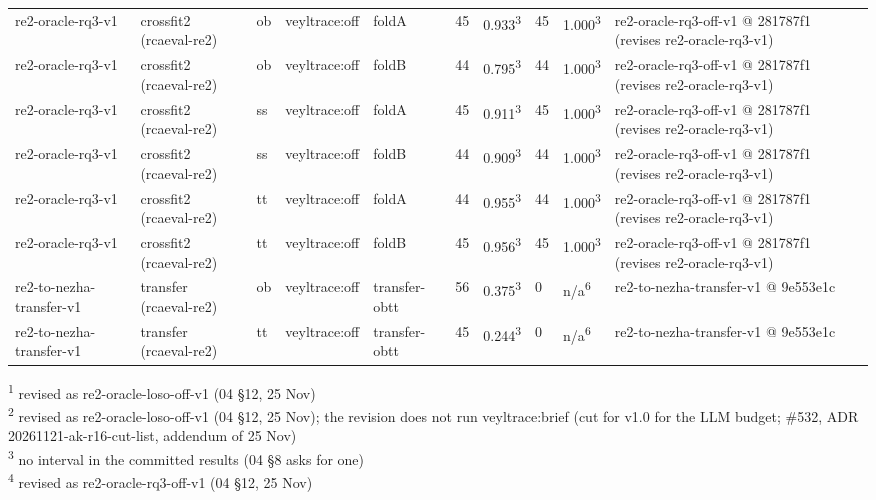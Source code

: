 \begin{table}[t]
\begin{tabular}{llllllllll}
re2-oracle-rq3-v1 & crossfit2 (rcaeval-re2) & ob & veyltrace:off & foldA & 45 & 0.933\textsuperscript{3} & 45 & 1.000\textsuperscript{3} & re2-oracle-rq3-off-v1 @ 281787f1 (revises re2-oracle-rq3-v1) \\
re2-oracle-rq3-v1 & crossfit2 (rcaeval-re2) & ob & veyltrace:off & foldB & 44 & 0.795\textsuperscript{3} & 44 & 1.000\textsuperscript{3} & re2-oracle-rq3-off-v1 @ 281787f1 (revises re2-oracle-rq3-v1) \\
re2-oracle-rq3-v1 & crossfit2 (rcaeval-re2) & ss & veyltrace:off & foldA & 45 & 0.911\textsuperscript{3} & 45 & 1.000\textsuperscript{3} & re2-oracle-rq3-off-v1 @ 281787f1 (revises re2-oracle-rq3-v1) \\
re2-oracle-rq3-v1 & crossfit2 (rcaeval-re2) & ss & veyltrace:off & foldB & 44 & 0.909\textsuperscript{3} & 44 & 1.000\textsuperscript{3} & re2-oracle-rq3-off-v1 @ 281787f1 (revises re2-oracle-rq3-v1) \\
re2-oracle-rq3-v1 & crossfit2 (rcaeval-re2) & tt & veyltrace:off & foldA & 44 & 0.955\textsuperscript{3} & 44 & 1.000\textsuperscript{3} & re2-oracle-rq3-off-v1 @ 281787f1 (revises re2-oracle-rq3-v1) \\
re2-oracle-rq3-v1 & crossfit2 (rcaeval-re2) & tt & veyltrace:off & foldB & 45 & 0.956\textsuperscript{3} & 45 & 1.000\textsuperscript{3} & re2-oracle-rq3-off-v1 @ 281787f1 (revises re2-oracle-rq3-v1) \\
re2-to-nezha-transfer-v1 & transfer (rcaeval-re2) & ob & veyltrace:off & transfer-obtt & 56 & 0.375\textsuperscript{3} & 0 & n/a\textsuperscript{6} & re2-to-nezha-transfer-v1 @ 9e553e1c \\
re2-to-nezha-transfer-v1 & transfer (rcaeval-re2) & tt & veyltrace:off & transfer-obtt & 45 & 0.244\textsuperscript{3} & 0 & n/a\textsuperscript{6} & re2-to-nezha-transfer-v1 @ 9e553e1c \\
\hline
\end{tabular}
\par\smallskip\footnotesize
\textsuperscript{1} revised as re2-oracle-loso-off-v1 (04 \S{}12, 25 Nov)\\
\textsuperscript{2} revised as re2-oracle-loso-off-v1 (04 \S{}12, 25 Nov); the revision does not run veyltrace:brief (cut for v1.0 for the LLM budget; \#532, ADR 20261121-ak-r16-cut-list, addendum of 25 Nov)\\
\textsuperscript{3} no interval in the committed results (04 \S{}8 asks for one)\\
\textsuperscript{4} revised as re2-oracle-rq3-off-v1 (04 \S{}12, 25 Nov)\\

\end{table}
